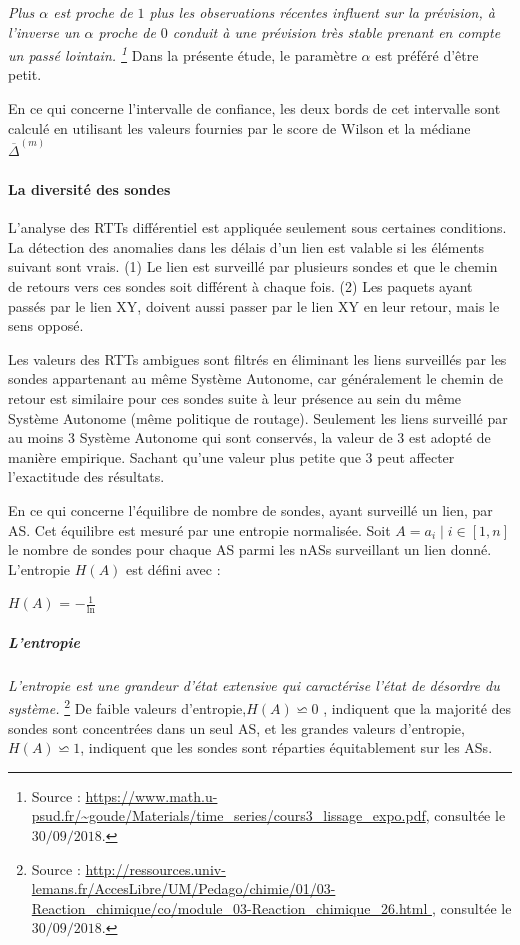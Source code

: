 \documentclass[]{report}
\begin{document}
\textit{Plus $\alpha$ est proche de $ 1 $ plus les observations récentes influent sur la prévision, à l'inverse un $\alpha$ proche de $0$ conduit à une prévision très stable prenant en compte un passé lointain. \footnote{Source : \url{https://www.math.u-psud.fr/~goude/Materials/time_series/cours3_lissage_expo.pdf}, consultée le $30/09/2018$.}}  Dans la présente étude, le paramètre $\alpha$ est préféré d'être petit.
 
 En ce qui concerne l'intervalle de confiance, les deux bords de cet intervalle sont calculé en utilisant les valeurs fournies par le score de Wilson et la médiane $\overline{\Delta} ^ {(m)}$
 

\paragraph{La diversité des sondes}
L'analyse des RTTs différentiel est appliquée seulement sous certaines conditions. La détection des anomalies dans les délais d'un lien est valable si les éléments suivant sont vrais. (1) Le lien est surveillé par plusieurs sondes et que le chemin de retours vers ces sondes soit différent à chaque fois. (2) Les paquets ayant passés par le lien XY, doivent aussi passer par le lien XY en leur retour, mais le sens opposé. 

Les valeurs des RTTs ambigues sont filtrés en éliminant les liens surveillés  par les sondes appartenant au même Système Autonome, car généralement le chemin de retour est similaire pour ces sondes suite à leur présence au sein du même Système Autonome (même politique de routage). 
Seulement les liens surveillé par au moins $3$ Système Autonome qui sont conservés, la valeur de $3$ est adopté de manière empirique. Sachant qu'une valeur plus petite que $3$ peut affecter l'exactitude des résultats. 

En ce qui concerne l'équilibre de nombre de sondes, ayant surveillé un lien, par AS. Cet équilibre est mesuré par une entropie normalisée. Soit $A = { a_i \mid i \in [1, n] }$ le nombre de sondes pour chaque AS parmi les nASs surveillant un lien donné. L'entropie $H(A)$ est défini avec :

$H(A)$ = $ - \frac{1}{\ln} $


\subparagraph{L'entropie }

\textit{L'entropie est une grandeur d'état extensive  qui caractérise l'état de désordre du système.} \footnote{Source : \url{ http://ressources.univ-lemans.fr/AccesLibre/UM/Pedago/chimie/01/03-Reaction_chimique/co/module_03-Reaction_chimique_26.html
		}, consultée le $30/09/2018$.}
De faible valeurs d'entropie,$H(A) \backsimeq 0$ , indiquent que la majorité des sondes sont concentrées dans un seul AS, et les grandes valeurs d'entropie, $H(A) \backsimeq 1$, indiquent que les sondes sont réparties équitablement sur les ASs. 
\end{document}
